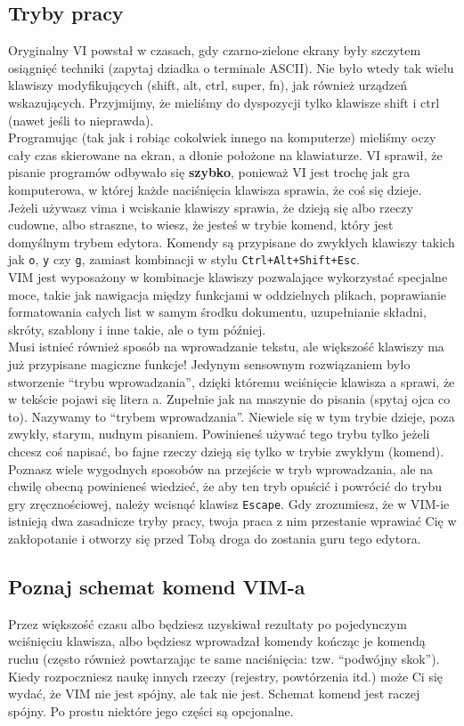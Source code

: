 \documentclass[a4paper,12pt]{article}
\begin{document}
\subsection{Tryby pracy}
Oryginalny VI powstał w czasach, gdy czarno-zielone ekrany były szczytem osiągnięć techniki (zapytaj dziadka o terminale ASCII). Nie było wtedy tak wielu klawiszy modyfikujących (shift, alt, ctrl, super, fn), jak również urządzeń wskazujących. Przyjmijmy, że mieliśmy do dyspozycji tylko klawisze shift i ctrl (nawet jeśli to nieprawda).\\
Programując (tak jak i robiąc cokolwiek innego na komputerze) mieliśmy oczy cały czas skierowane na ekran, a dłonie położone na klawiaturze. VI sprawił, że pisanie programów odbywało się {\bf szybko}, ponieważ VI jest trochę jak gra komputerowa, w której każde naciśnięcia klawisza sprawia, że coś się dzieje.\\
Jeżeli używasz vima i wciskanie klawiszy sprawia, że dzieją się albo rzeczy cudowne, albo straszne, to wiesz, że jesteś w trybie komend, który jest domyślnym trybem edytora. Komendy są przypisane do zwykłych klawiszy takich jak {\tt o}, {\tt y} czy {\tt g}, zamiast kombinacji w stylu {\tt Ctrl+Alt+Shift+Esc}.\\
VIM jest wyposażony w kombinacje klawiszy pozwalające wykorzystać specjalne moce, takie jak nawigacja między funkcjami w oddzielnych plikach, poprawianie formatowania całych list w samym środku dokumentu, uzupełnianie składni, skróty, szablony i inne takie, ale o tym później.\\
Musi istnieć również sposób na wprowadzanie tekstu, ale większość klawiszy ma już przypisane magiczne funkcje! Jedynym sensownym rozwiązaniem było stworzenie “trybu wprowadzania”, dzięki któremu wciśnięcie klawisza a sprawi, że w tekście pojawi się litera a. Zupełnie jak na maszynie do pisania (spytaj ojca co to). Nazywamy to “trybem wprowadzania”. Niewiele się w tym trybie dzieje, poza zwykły, starym, nudnym pisaniem. Powinieneś używać tego trybu tylko jeżeli chcesz coś napisać, bo fajne rzeczy dzieją się tylko w trybie zwykłym (komend).\\
Poznasz wiele wygodnych sposobów na przejście w tryb wprowadzania, ale na chwilę obecną powinieneś wiedzieć, że aby ten tryb opuścić i powrócić do trybu gry zręcznościowej, należy wcisnąć klawisz {\tt Escape}.
Gdy zrozumiesz, że w VIM-ie istnieją dwa zasadnicze tryby pracy, twoja praca z nim przestanie wprawiać Cię w zakłopotanie i otworzy się przed Tobą droga do zostania guru tego edytora.
\subsection{Poznaj schemat komend VIM-a}
Przez większość czasu albo będziesz uzyskiwał rezultaty po pojedynczym wciśnięciu klawisza, albo będziesz wprowadzał komendy kończąc je komendą ruchu (często również powtarzając te same naciśnięcia: tzw. “podwójny skok”). Kiedy rozpoczniesz naukę innych rzeczy (rejestry, powtórzenia itd.) może Ci się wydać, że VIM nie jest spójny, ale tak nie jest. Schemat komend jest raczej spójny. Po prostu niektóre jego części są opcjonalne.\\
\end{document}

